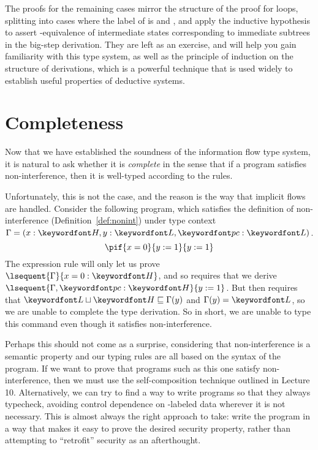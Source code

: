 \documentclass[11pt,twoside]{scrartcl}
\begin{document}
The proofs for the remaining cases mirror the structure of  the proof for  loops, splitting into cases where the label of \pc is \lowsec and \hisec, and apply the inductive hypothesis to assert \lowsec-equivalence of intermediate states corresponding to immediate subtrees in the big-step derivation. They are left as an exercise, and will help you gain familiarity with this type system, as well as the principle of induction on the structure of derivations, which is a powerful technique that is used widely to establish useful properties of deductive systems.

\section{Completeness}

Now that we have  established the soundness of the information flow type system, it is natural to ask whether it is \emph{complete} in the sense that if a program satisfies non-interference, then it is well-typed according to the rules.

Unfortunately, this is not the case, and the reason is the way that implicit flows are handled. Consider the following program, which satisfies the definition of non-interference (Definition~\ref{def:nonint}) under type context $\Gamma = (x : \hisec, y : \lowsec, \pc : \lowsec)$.
\[
\pif{x = 0}{y := 1}{y := 1}
\]
The expression rule  will only let us prove $\lsequent{\Gamma}{x = 0 : \hisec}$, and so  requires that we derive $\lsequent{\Gamma,\pc : \hisec}{y := 1}$. But  then requires that $\lowsec \lub \hisec \posetleq \Gamma(y)$ and $\Gamma(y) = \lowsec$, so we are unable to complete the type derivation. So in short, we are unable to type this command even though it satisfies non-interference.

Perhaps this should not come as a surprise, considering that non-interference is a semantic property and our typing rules are all based on the syntax of the program. If we want to prove that programs such as this one satisfy non-interference, then we must use the self-composition technique outlined in Lecture 10. Alternatively, we can try to find a way to write programs so that they always typecheck, avoiding control dependence on \hisec-labeled data wherever it is not necessary. This is almost always the right approach to take: write the program in a way that makes it easy to prove the desired security property, rather than attempting to ``retrofit'' security as an afterthought.



\end{document}
